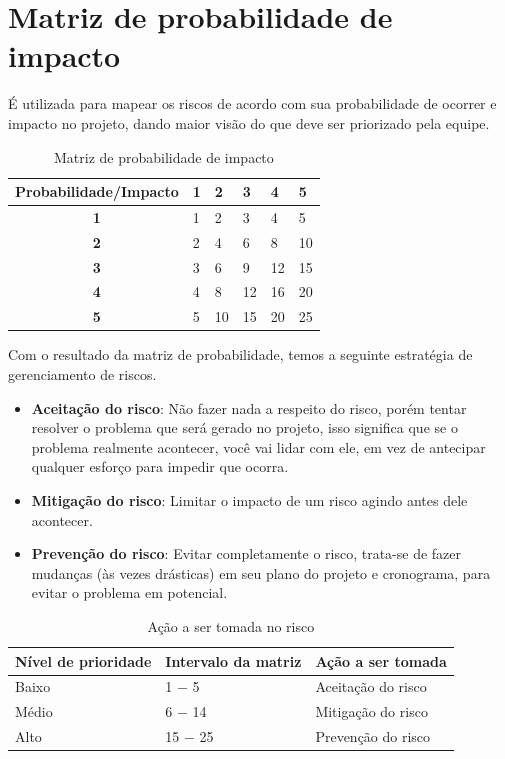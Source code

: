 \section{Matriz de probabilidade de impacto}

  É utilizada para mapear os riscos de acordo com sua probabilidade de ocorrer e impacto no projeto, dando maior visão do que deve ser
  priorizado pela equipe.

  \begin{table}[!htb]
    \centering
    \begin{tabular}{cp{2cm}p{2cm}p{2cm}p{2cm}p{2cm}}
      \toprule
        \textbf{Probabilidade/Impacto} & \textbf{1} & \textbf{2} & \textbf{3} & \textbf{4} & \textbf{5} \\
      \midrule
        \textbf{1} & 1 & 2  & 3  & 4  & 5  \\ \midrule
        \textbf{2} & 2 & 4  & 6  & 8  & 10 \\ \midrule
        \textbf{3} & 3 & 6  & 9  & 12 & 15 \\ \midrule
        \textbf{4} & 4 & 8  & 12 & 16 & 20 \\ \midrule
        \textbf{5} & 5 & 10 & 15 & 20 & 25 \\
      \bottomrule
    \end{tabular}
    \caption{Matriz de probabilidade de impacto}
  \end{table}

  Com o resultado da matriz de probabilidade, temos a seguinte estratégia de gerenciamento de riscos.

  \begin{itemize}
    \item \textbf{Aceitação do risco}: Não fazer nada a respeito do risco, porém tentar resolver o problema que será gerado no projeto,
      isso significa que se o problema realmente acontecer, você vai lidar com ele, em vez de antecipar  qualquer esforço para impedir
      que ocorra.
    \item \textbf{Mitigação do risco}: Limitar o impacto de um risco agindo antes dele acontecer.
    \item \textbf{Prevenção do risco}: Evitar completamente o risco, trata-se de fazer mudanças (às vezes drásticas) em seu plano do
      projeto e cronograma, para evitar o problema em potencial.
  \end{itemize}

  \begin{table}[!htb]
    \centering
    \begin{tabular}{p{5cm}p{5cm}p{5cm}}
      \toprule
        \textbf{Nível de prioridade} & \textbf{Intervalo da matriz} & \textbf{Ação a ser tomada} \\
      \midrule
      Baixo & 1 $-$ 5   & Aceitação do risco \\ \midrule
      Médio & 6 $-$ 14  & Mitigação do risco \\ \midrule
      Alto  & 15 $-$ 25 & Prevenção do risco \\
      \bottomrule
    \end{tabular}
    \caption{Ação a ser tomada no risco}
  \end{table}


